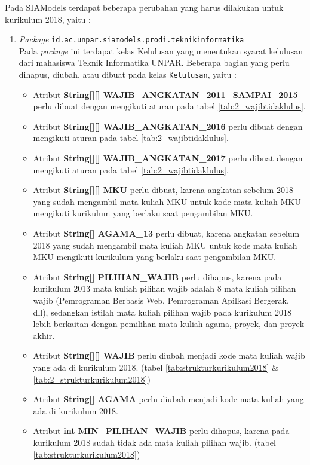 Pada SIAModels terdapat beberapa perubahan yang harus dilakukan untuk kurikulum 2018, yaitu :
\begin{enumerate}
	\item \textit{Package} \texttt{id.ac.unpar.siamodels.prodi.teknikinformatika}\\
	Pada \textit{package} ini terdapat kelas Kelulusan yang menentukan syarat kelulusan dari mahasiswa Teknik Informatika UNPAR. Beberapa bagian yang perlu dihapus, diubah, atau dibuat pada kelas \texttt{Kelulusan}, yaitu :
	\begin{itemize}
		\item Atribut \textbf{String[][] WAJIB\_ANGKATAN\_2011\_SAMPAI\_2015} perlu dibuat dengan mengikuti aturan pada tabel \ref{tab:2_wajibtidaklulus}.
		\item Atribut \textbf{String[][] WAJIB\_ANGKATAN\_2016} perlu dibuat dengan mengikuti aturan pada tabel \ref{tab:2_wajibtidaklulus}.
		\item Atribut \textbf{String[][] WAJIB\_ANGKATAN\_2017} perlu dibuat dengan mengikuti aturan pada tabel \ref{tab:2_wajibtidaklulus}.
		\item Atribut \textbf{String[][] MKU} perlu dibuat, karena angkatan sebelum 2018 yang sudah mengambil mata kuliah MKU untuk kode mata kuliah MKU mengikuti kurikulum yang berlaku saat pengambilan MKU.
		\item Atribut \textbf{String[] AGAMA\_13} perlu dibuat, karena angkatan sebelum 2018 yang sudah mengambil mata kuliah MKU untuk kode mata kuliah MKU mengikuti kurikulum yang berlaku saat pengambilan MKU.
		\item Atribut \textbf{String[] PILIHAN\_WAJIB} perlu dihapus, karena pada kurikulum 2013 mata kuliah pilihan wajib adalah 8 mata kuliah pilihan wajib (Pemrograman Berbasis Web, Pemrograman Apilkasi Bergerak, dll), sedangkan istilah mata kuliah pilihan wajib pada kurikulum 2018 lebih berkaitan dengan pemilihan mata kuliah agama, proyek, dan proyek akhir.
		\item Atribut \textbf{String[][] WAJIB} perlu diubah menjadi kode mata kuliah wajib yang ada di kurikulum 2018. (tabel \ref{tab:strukturkurikulum2018} \& \ref{tab:2_strukturkurikulum2018})
		\item Atribut \textbf{String[] AGAMA} perlu diubah menjadi kode mata kuliah yang ada di kurikulum 2018.
		\item Atribut \textbf{int MIN\_PILIHAN\_WAJIB} perlu dihapus, karena pada kurikulum 2018 sudah tidak ada mata kuliah pilihan wajib. (tabel \ref{tab:strukturkurikulum2018})

\end{itemize}
\end{enumerate}
